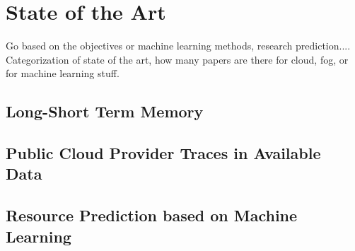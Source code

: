 \chapter{State of the Art}

    Go based on the objectives or machine learning methods, research prediction....
    Categorization of state of the art, how many papers are there for cloud, fog, or for machine learning stuff.

    \section{Long-Short Term Memory}
    \section{Public Cloud Provider Traces in Available Data}
    \section{Resource Prediction based on Machine Learning}
